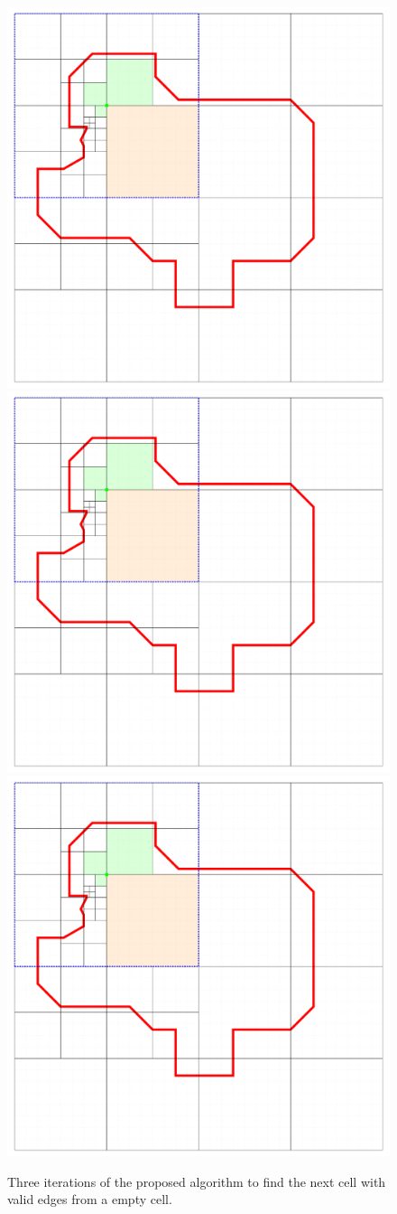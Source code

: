 \begin{figure}[!ht]
    \centering
    \includegraphics[page=1, width=0.49\linewidth]{figures/cellinpolygon/example}
    \includegraphics[page=2, width=0.49\linewidth]{figures/cellinpolygon/example}
    \includegraphics[page=3, width=0.49\linewidth]{figures/cellinpolygon/example}
    \caption{Three iterations of the proposed algorithm to find the next cell with valid edges from a empty cell.} \label{fig:emptycellexample}
\end{figure}

